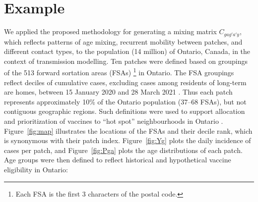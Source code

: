 \section{Example}\label{ex}
We applied the proposed methodology for generating a mixing matrix $C_{gag'a'y}$,
which reflects patterns of age mixing, recurrent mobility between patches, and different contact types,
to the population (14 million) of Ontario, Canada, in the context of \covid transmission modelling.
Ten patches were defined based on groupings of the 513 forward sortation areas (FSAs)%
\footnote{Each FSA is the first 3 characters of the postal code.} in Ontario.
The FSA groupings reflect deciles of cumulative \covid cases,
excluding cases among residents of long-term are homes,
between 15 January 2020 and 28 March 2021 \cite{ICES2020}.
Thus each patch represents approximately 10\% of the Ontario population (\mbox{37--68} FSAs),
but not contiguous geographic regions.
Such definitions were used to support allocation and prioritization of \covid vaccines
to ``hot spot'' neighbourhoods in Ontario \cite{Mishra2021,Brown2021}.
Figure~\ref{fig:map} illustrates the locations of the FSAs and their decile rank,
which is synonymous with their patch index.
Figure~\ref{fig:Yg} plots the daily incidence of \covid cases per patch, and
Figure~\ref{fig:Pga} plots the age distributions of each patch.
Age groups were then defined to reflect historical and hypothetical \covid vaccine eligibility in Ontario:
